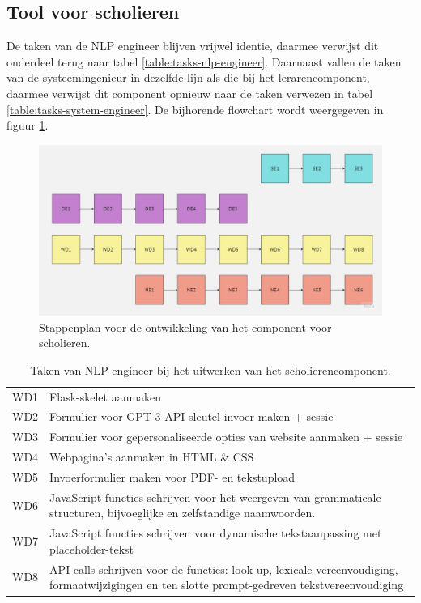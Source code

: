 \subsection{Tool voor scholieren}

De taken van de NLP engineer blijven vrijwel identie, daarmee verwijst dit onderdeel terug naar tabel \ref{table:tasks-nlp-engineer}. Daarnaast vallen de taken van de systeemingenieur in dezelfde lijn als die bij het lerarencomponent, daarmee verwijst dit component opnieuw naar de taken verwezen in tabel \ref{table:tasks-system-engineer}. De bijhorende flowchart wordt weergegeven in figuur \ref{img:stappenplan-scholars}.

\medspace

\begin{figure}[H]
	\includegraphics[width=\linewidth]{img/flowchart-development-scholars.jpg}
	\caption{Stappenplan voor de ontwikkeling van het component voor scholieren.}
	\label{img:stappenplan-scholars}
\end{figure}

\begin{center}
	\begin{table}
		\begin{tabular}{ | m{2cm} | m{12cm} | } 
			\hline
			WD1 & Flask-skelet aanmaken \\
			WD2 & Formulier voor GPT-3 API-sleutel invoer maken + sessie \\
			WD3 & Formulier voor gepersonaliseerde opties van website aanmaken + sessie \\
			WD4 & Webpagina's aanmaken in HTML \& CSS \\
			WD5 & Invoerformulier maken voor PDF- en tekstupload \\
			WD6 & JavaScript-functies schrijven voor het weergeven van grammaticale structuren, bijvoeglijke en zelfstandige naamwoorden. \\
			WD7 & JavaScript functies schrijven voor dynamische tekstaanpassing met placeholder-tekst \\
			WD8 & API-calls schrijven voor de functies: look-up, lexicale vereenvoudiging, formaatwijzigingen en ten slotte prompt-gedreven tekstvereenvoudiging \\
			\hline
		\end{tabular}
		\caption{Taken van NLP engineer bij het uitwerken van het scholierencomponent.}
		\label{table:tasks-nlp-engineer-scholars}
	\end{table}
\end{center}

